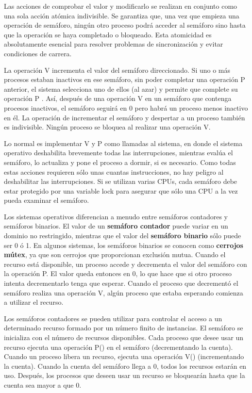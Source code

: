 \documentclass[10pt]{book}
\begin{document}
Las acciones de comprobar el valor y modificarlo se realizan en conjunto como una sola acción atómica indivisible. Se garantiza que, una vez que empieza una operación de semáforo, ningún otro proceso podrá acceder al semáforo sino hasta que la operación se haya completado o bloqueado. Esta atomicidad es absolutamente esencial para resolver problemas de sincronización y evitar condiciones de carrera.

La operación {\mf V} incrementa el valor del semáforo direccionado. Si uno o más procesos estaban inactivos en ese semáforo, sin poder completar una operación {\mf P} anterior, el sistema selecciona uno de ellos (al azar) y permite que complete su operación {\mf P} . Así, después de una
operación {\mf V} en un semáforo que contenga procesos inactivos, el semáforo seguirá en 0 pero habrá un proceso menos inactivo en él. La operación de incrementar el semáforo y despertar a un proceso también es indivisible. Ningún proceso se bloquea al realizar una operación {\mf V}.

Lo normal es implementar {\mf V} y {\mf P} como llamadas al sistema, en donde el sistema operativo deshabilita brevemente todas las interrupciones, mientras evalúa el semáforo, lo actualiza y pone el proceso a dormir, si es necesario. Como todas estas acciones requieren sólo unas cuantas instrucciones, no hay peligro al deshabilitar las interrupciones. Si se utilizan varias CPUs, cada semáforo debe estar protegido por una variable lock para asegurar que sólo una CPU a la vez pueda examinar el semáforo.

Los sistemas operativos diferencian a menudo entre semáforos contadores y semáforos binarios. El valor de un \textbf{semáforo contador} puede variar en un dominio no restringido, mientras que el valor del \textbf{semáforo binario} sólo puede ser 0 ó 1. En algunos sistemas, los semáforos binarios se conocen como \textbf{cerrojos mútex}, ya que son cerrojos que proporcionan exclusión mutua. Cuando el recurso está disponible, un proceso accede y decrementa el valor del semáforo con la operación P. El valor queda entonces en 0, lo que hace que si otro proceso intenta decrementarlo tenga que esperar. Cuando el proceso que decrementó el semáforo realiza una operación V, algún proceso que estaba esperando comienza a utilizar el recurso.

Los semáforos contadores se pueden utilizar para controlar el acceso a un determinado recurso formado por un número finito de instancias. El semáforo se inicializa con el número de recursos disponibles. Cada proceso que desee usar un recurso ejecuta una operación {\mf P()} en el semáforo (decrementando la cuenta). Cuando un proceso libera un recurso, ejecuta una operación {\mf V()} (incrementando la cuenta). Cuando la cuenta del semáforo llega a 0, todos los recursos estarán en uso. Después, los procesos que deseen usar un recurso se bloquearán hasta que la cuenta sea mayor a que 0.
\end{document}
